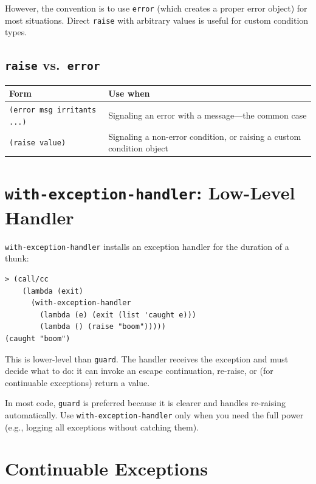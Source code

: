 However, the convention is to use \texttt{error} (which creates a proper error object) for most situations. Direct \texttt{raise} with arbitrary values is useful for custom condition types.

\subsection{\texttt{raise} vs.\ \texttt{error}}

\begin{center}
\begin{tabular}{lp{7cm}}
\textbf{Form} & \textbf{Use when} \\
\hline
\texttt{(error msg irritants ...)} & Signaling an error with a message---the common case \\
\texttt{(raise value)} & Signaling a non-error condition, or raising a custom condition object \\
\end{tabular}
\end{center}

\section{\texttt{with-exception-handler}: Low-Level Handler}

\texttt{with-exception-handler} installs an exception handler for the duration of a thunk:

\begin{lstlisting}[style=repl]
> (call/cc
    (lambda (exit)
      (with-exception-handler
        (lambda (e) (exit (list 'caught e)))
        (lambda () (raise "boom")))))
(caught "boom")
\end{lstlisting}

This is lower-level than \texttt{guard}. The handler receives the exception and must decide what to do: it can invoke an escape continuation, re-raise, or (for continuable exceptions) return a value.

In most code, \texttt{guard} is preferred because it is clearer and handles re-raising automatically. Use \texttt{with-exception-handler} only when you need the full power (e.g., logging all exceptions without catching them).

\section{Continuable Exceptions}

